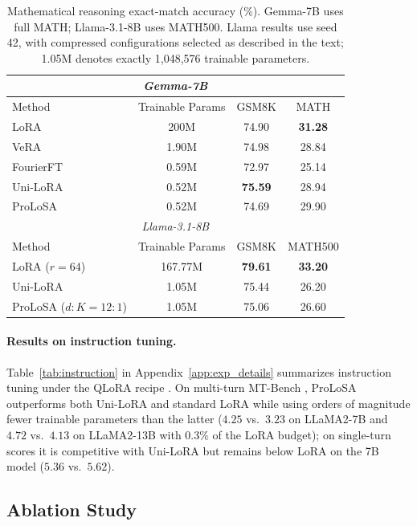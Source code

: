 \begin{table}[t]
\centering
\small
\begin{tabular}{lccc}
\toprule
\multicolumn{4}{c}{\textit{Gemma-7B}} \\
\midrule
Method & Trainable Params & GSM8K & MATH \\
\midrule
LoRA        & 200M    & {74.90} & \textbf{31.28} \\
VeRA        & 1.90M   & 74.98 & 28.84 \\
FourierFT   & 0.59M   & 72.97 & 25.14 \\
Uni-LoRA    & 0.52M   & \textbf{75.59} & 28.94 \\
{ProLoSA}   & 0.52M   & 74.69 & 29.90    \\
\midrule
\multicolumn{4}{c}{\textit{Llama-3.1-8B}} \\
\midrule
Method & Trainable Params & GSM8K & MATH500 \\
\midrule
LoRA ($r=64$) & 167.77M & \textbf{79.61} & \textbf{33.20} \\
Uni-LoRA & 1.05M & 75.44 & 26.20 \\
ProLoSA ($d:K=12:1$) & 1.05M & 75.06 & 26.60 \\
\bottomrule
\end{tabular}
\caption{Mathematical reasoning exact-match accuracy (\%). Gemma-7B uses full MATH; Llama-3.1-8B uses MATH500. Llama results use seed 42, with compressed configurations selected as described in the text; 1.05M denotes exactly 1,048,576 trainable parameters.}
\label{tab:math}
\end{table}




\paragraph{Results on instruction tuning.}
Table~\ref{tab:instruction} in Appendix~\ref{app:exp_details} summarizes instruction tuning under the QLoRA recipe \citep{dettmers2023qlora}. On multi-turn MT-Bench \citep{zheng2023judging}, ProLoSA outperforms both Uni-LoRA and standard LoRA \citep{hu2022lora} while using orders of magnitude fewer trainable parameters than the latter ($4.25$ vs.\ $3.23$ on LLaMA2-7B and $4.72$ vs.\ $4.13$ on LLaMA2-13B with $0.3\%$ of the LoRA budget); on single-turn scores it is competitive with Uni-LoRA but remains below LoRA on the 7B model ($5.36$ vs.\ $5.62$).


\subsection{Ablation Study}
\label{sec:ablation}

